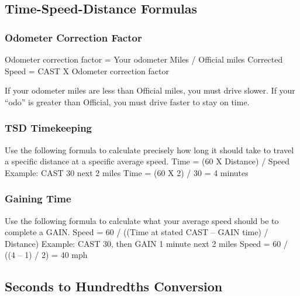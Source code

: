 \subsection{Time-Speed-Distance Formulas}
\subsubsection{Odometer Correction Factor}
\indent Odometer correction factor = Your odometer Miles / Official miles
\indent Corrected Speed = CAST X Odometer correction factor

If your odometer miles are less than Official miles, you must drive slower. If your “odo” is greater than Official, you must drive faster to stay on time.

\subsubsection{TSD Timekeeping}
Use the following formula to calculate precisely how long it should
take to travel a specific distance at a specific average speed.
\indent Time = (60 X Distance) / Speed
\indent Example: CAST 30 next 2 miles
\indent Time = (60 X 2) / 30 = 4 minutes

\subsubsection{Gaining Time}
Use the following formula to calculate what your average speed
should be to complete a GAIN.
\indent Speed = 60 / ((Time at stated CAST – GAIN time) / Distance)
\indent Example: CAST 30, then GAIN 1 minute next 2 miles
\indent Speed = 60 / ((4 – 1) / 2) = 40 mph

\subsection{Seconds to Hundredths Conversion}

